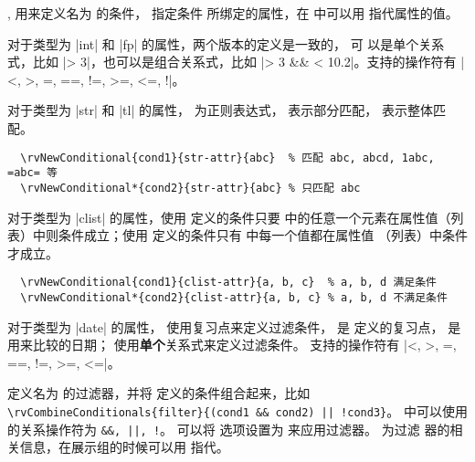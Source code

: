 \documentclass[full]{l3doc}
\begin{document}
\begin{documentation}
\begin{function}{\rvNewConditional, \rvNewConditional*}
   用来定义名为  的条件， 指定条件
  所绑定的属性，在  中可以用  指代属性的值。
\end{function}

  对于类型为 |int| 和 |fp| 的属性，两个版本的定义是一致的， 可
  以是单个关系式，比如 |\rval > 3|，也可以是组合关系式，比如
  |\rval > 3 && \rval < 10.2|。支持的操作符有 |<, >, =, ==, !=, >=, <=, !|。

  对于类型为 |str| 和 |tl| 的属性， 为正则表达式，
   表示部分匹配， 表示整体匹配。
\begin{verbatim}
  \rvNewConditional{cond1}{str-attr}{abc}  % 匹配 abc, abcd, 1abc, =abc= 等
  \rvNewConditional*{cond2}{str-attr}{abc} % 只匹配 abc
\end{verbatim}

  对于类型为 |clist| 的属性，使用  定义的条件只要
   中的任意一个元素在属性值（列表）中则条件成立；使用
   定义的条件只有  中每一个值都在属性值
  （列表）中条件才成立。

\begin{verbatim}
  \rvNewConditional{cond1}{clist-attr}{a, b, c}  % a, b, d 满足条件
  \rvNewConditional*{cond2}{clist-attr}{a, b, c} % a, b, d 不满足条件
\end{verbatim}

  对于类型为 |date| 的属性， 使用复习点来定义过滤条件，
   是  定义的复习点， 是
  用来比较的日期； 使用\textbf{单个}关系式来定义过滤条件。
  支持的操作符有 |<, >, =, ==, !=, >=, <=|。

\begin{function}{\rvCombineConditionals}
  \begin{syntax}
       
  \end{syntax}

   定义名为  的过滤器，并将
   定义的条件组合起来，比如
  \verb=\rvCombineConditionals{filter}{(cond1 && cond2) || !cond3}=。
   中可以使用的关系操作符为 \verb=&&, ||, !=。
  可以将  选项设置为  来应用过滤器。 为过滤
  器的相关信息，在展示组的时候可以用  指代。
\end{function}


\end{documentation}
\end{document}
